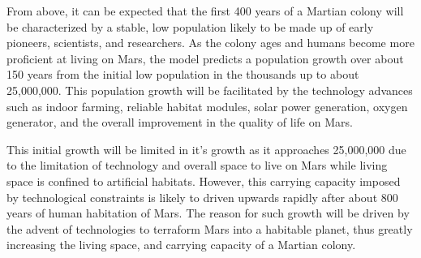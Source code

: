 \documentclass[12pt]{article}
\begin{document}
From above, it can be expected that the first 400 years of a Martian colony will be characterized by a stable, low population likely to be made up of early pioneers, scientists, and researchers. As the colony ages and humans become more proficient at living on Mars, the model predicts a population growth over about 150 years from the initial low population in the thousands up to about 25,000,000. This population growth will be facilitated by the technology advances such as indoor farming, reliable habitat modules, solar power generation, oxygen generator, and the overall improvement in the quality of life on Mars. 


This initial growth will be limited in it's growth as it approaches  25,000,000 due to the limitation of technology and overall space to live on Mars while living space is confined to artificial habitats. However, this carrying capacity imposed by technological constraints is likely to driven upwards rapidly after about 800 years of human habitation of Mars. The reason for such growth will be driven by the advent of technologies to terraform Mars into a habitable planet\cite{terraform}, thus greatly increasing the living space, and carrying capacity of a Martian colony. 
\end{document}
